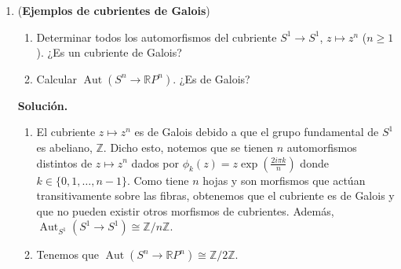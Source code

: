 \documentclass[11pt,a4paper]{article}
\theoremstyle{plain}
\theoremstyle{definition}
\theoremstyle{remark}
\newcommand{\RR}{\mathbb R}
\newcommand{\ZZ}{\mathbb Z}
\DeclareMathOperator{\Aut}{Aut}
\DeclareMathOperator{\Lev}{Lev}
\begin{document}
\begin{enumerate}[label=\arabic*.,leftmargin=*]
\begin{enumerate}[label=\alph*)]
Sea $\alpha\in\Omega(B,b)$ y sea $\tilde\alpha\in\Lev(\alpha)$ con
$\tilde\alpha(0)=x$ y $\tilde\alpha(1)=y$. Por hipótesis,
$p_*\pi_1(X,x)=p_*\pi_1(X,y)$. Entonces, por el
Teorema~\ref{thm:teo-levantamiento}, existe un automorfismo
$h_\alpha=h([\alpha])\in\Aut(p)$ que envía $x$ sobre $y$.
\item Consideremos nuevamente $\alpha\in\Omega(B,b)$ y
$\tilde\alpha_x\in\Lev(\alpha)$ a su único levantamiento de origen
$x\in p^{-1}(b)$. Entonces, por definición de $h$,
$h([\alpha])(x)=\tilde\alpha_x(1)$. Además, para todo automorfismo $g$ de
cubrientes, se tiene $g\circ\tilde\alpha_x=\tilde\alpha_{g(x)}$ ya que
$g\circ\tilde\alpha_x\in\Lev(\alpha)$ y
$(g\circ\tilde\alpha_x)(1)=g(x)$.

Mostremos que $h:\pi_1(B,b)\to\Aut(p)$ es un homomorfismo de grupos.
Levantamos a $\alpha$ de $x$ con $h([\alpha])(x)=y$, luego $\alpha'$ de $y$
a $h([\alpha'])(y)=z$; en otros términos,
$\tilde\alpha_x(1)=y$, $\tilde\alpha'_y(1)=z$, $\widetilde{\alpha\alpha'}_x(1)=z$.
El automorfismo $h([\alpha\alpha'])$ envía todo punto $x\in p^{-1}(b)$ en la
extremidad $z$ de $\widetilde{\alpha\alpha'}_x$. Se tiene,
\[
h([\alpha])\circ h([\alpha'])(x)=h([\alpha])(\tilde\alpha'_x(1))=\tilde\alpha'_{h([\alpha])(x)}(1)=\tilde\alpha'_y(1)=z.
\]
Por lo tanto, $h:\pi_1(B,b)\to\Aut(p)$ es un homomorfismo de grupos. Ahora
bien,
\[
\ker(h)=\{[\alpha]\in\pi_1(B,b)\mid h([\alpha])(x)=x\ \forall x\in p^{-1}(b)\}=p_*\pi_1(X,x).
\]
\end{enumerate}

\item (\textbf{Ejemplos de cubrientes de Galois})
\begin{enumerate}[label=\alph*)]
\item Determinar todos los automorfismos del cubriente $S^1\to S^1$,
$z\mapsto z^n$ ($n\ge1$). ¿Es un cubriente de Galois?
\item Calcular $\Aut(S^n\to\RR P^n)$. ¿Es de Galois?
\end{enumerate}

\noindent\textbf{Solución.}
\begin{enumerate}[label=\alph*)]
\item El cubriente $z\mapsto z^n$ es de Galois debido a que el grupo
fundamental de $S^1$ es abeliano, $\ZZ$. Dicho esto, notemos que se tienen
$n$ automorfismos distintos de $z\mapsto z^n$ dados por
$\phi_k(z)=z\exp\left(\frac{2i\pi k}{n}\right)$ donde $k\in\{0,1,\dots,n-1\}$.
Como tiene $n$ hojas y son morfismos que actúan transitivamente sobre las
fibras, obtenemos que el cubriente es de Galois y que no pueden existir
otros morfismos de cubrientes. Además, $\Aut_{S^1}(S^1\to S^1)\cong\ZZ/n\ZZ$.
\item Tenemos que $\Aut(S^n\to\RR P^n)\cong\ZZ/2\ZZ$.
\end{enumerate}


\end{enumerate}
\end{document}

